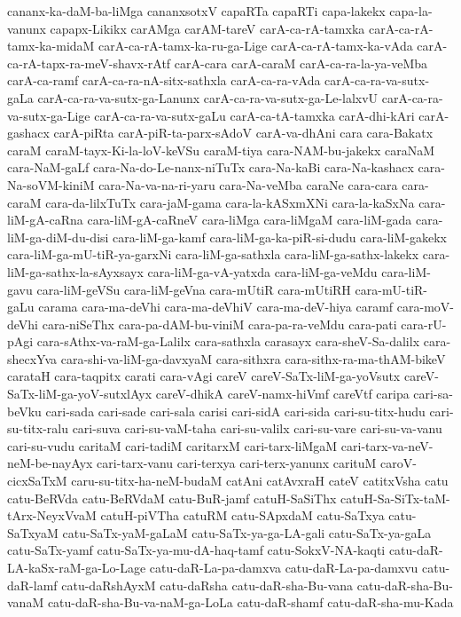 {cananx-ka-daM-ba-liMga
cananxsotxV
capaRTa
capaRTi
capa-lakekx
capa-la-vanunx
capapx-Likikx
carAMga
carAM-tareV
carA-ca-rA-tamxka
carA-ca-rA-tamx-ka-midaM
carA-ca-rA-tamx-ka-ru-ga-Lige
carA-ca-rA-tamx-ka-vAda
carA-ca-rA-tapx-ra-meV-shavx-rAtf
carA-cara
carA-caraM
carA-ca-ra-la-ya-veMba
carA-ca-ramf
carA-ca-ra-nA-sitx-sathxla
carA-ca-ra-vAda
carA-ca-ra-va-sutx-gaLa
carA-ca-ra-va-sutx-ga-Lanunx
carA-ca-ra-va-sutx-ga-Le-lalxvU
carA-ca-ra-va-sutx-ga-Lige
carA-ca-ra-va-sutx-gaLu
carA-ca-tA-tamxka
carA-dhi-kAri
carA-gashacx
carA-piRta
carA-piR-ta-parx-sAdoV
carA-va-dhAni
cara
cara-Bakatx
caraM
caraM-tayx-Ki-la-loV-keVSu
caraM-tiya
cara-NAM-bu-jakekx
caraNaM
cara-NaM-gaLf
cara-Na-do-Le-nanx-niTuTx
cara-Na-kaBi
cara-Na-kashacx
cara-Na-soVM-kiniM
cara-Na-va-na-ri-yaru
cara-Na-veMba
caraNe
cara-cara
cara-caraM
cara-da-lilxTuTx
cara-jaM-gama
cara-la-kASxmXNi
cara-la-kaSxNa
cara-liM-gA-caRna
cara-liM-gA-caRneV
cara-liMga
cara-liMgaM
cara-liM-gada
cara-liM-ga-diM-du-disi
cara-liM-ga-kamf
cara-liM-ga-ka-piR-si-dudu
cara-liM-gakekx
cara-liM-ga-mU-tiR-ya-garxNi
cara-liM-ga-sathxla
cara-liM-ga-sathx-lakekx
cara-liM-ga-sathx-la-sAyxsayx
cara-liM-ga-vA-yatxda
cara-liM-ga-veMdu
cara-liM-gavu
cara-liM-geVSu
cara-liM-geVna
cara-mUtiR
cara-mUtiRH
cara-mU-tiR-gaLu
carama
cara-ma-deVhi
cara-ma-deVhiV
cara-ma-deV-hiya
caramf
cara-moV-deVhi
cara-niSeThx
cara-pa-dAM-bu-viniM
cara-pa-ra-veMdu
cara-pati
cara-rU-pAgi
cara-sAthx-va-raM-ga-Lalilx
cara-sathxla
carasayx
cara-sheV-Sa-dalilx
cara-shecxYva
cara-shi-va-liM-ga-davxyaM
cara-sithxra
cara-sithx-ra-ma-thAM-bikeV
carataH
cara-taqpitx
carati
cara-vAgi
careV
careV-SaTx-liM-ga-yoVsutx
careV-SaTx-liM-ga-yoV-sutxlAyx
careV-dhikA
careV-namx-hiVmf
careVtf
caripa
cari-sa-beVku
cari-sada
cari-sade
cari-sala
carisi
cari-sidA
cari-sida
cari-su-titx-hudu
cari-su-titx-ralu
cari-suva
cari-su-vaM-taha
cari-su-valilx
cari-su-vare
cari-su-va-vanu
cari-su-vudu
caritaM
cari-tadiM
caritarxM
cari-tarx-liMgaM
cari-tarx-va-neV-neM-be-nayAyx
cari-tarx-vanu
cari-terxya
cari-terx-yanunx
carituM
caroV-cicxSaTxM
caru-su-titx-ha-neM-budaM
catAni
catAvxraH
cateV
catitxVsha
catu
catu-BeRVda
catu-BeRVdaM
catu-BuR-jamf
catuH-SaSiThx
catuH-Sa-SiTx-taM-tArx-NeyxVvaM
catuH-piVTha
catuRM
catu-SApxdaM
catu-SaTxya
catu-SaTxyaM
catu-SaTx-yaM-gaLaM
catu-SaTx-ya-ga-LA-gali
catu-SaTx-ya-gaLa
catu-SaTx-yamf
catu-SaTx-ya-mu-dA-haq-tamf
catu-SokxV-NA-kaqti
catu-daR-LA-kaSx-raM-ga-Lo-Lage
catu-daR-La-pa-damxva
catu-daR-La-pa-damxvu
catu-daR-lamf
catu-daRshAyxM
catu-daRsha
catu-daR-sha-Bu-vana
catu-daR-sha-Bu-vanaM
catu-daR-sha-Bu-va-naM-ga-LoLa
catu-daR-shamf
catu-daR-sha-mu-Kada
}
